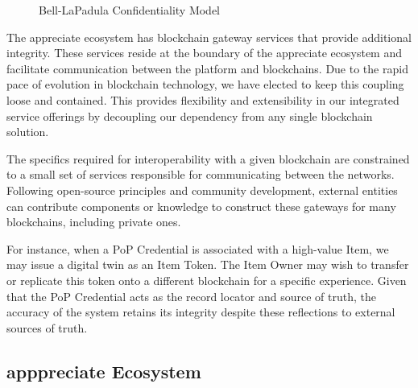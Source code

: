 \documentclass[a4paper,onecolumn, 10.5pt]{article}
\begin{document}
\begin{figure}[!htb]
	\centering %
	\caption{Bell-LaPadula Confidentiality Model}
	\label{fig: bella}
\end{figure}


The appreciate ecosystem has blockchain gateway services that provide additional integrity. These services reside at the boundary of the appreciate ecosystem and facilitate communication between the platform and blockchains. Due to the rapid pace of evolution in blockchain technology, we have elected to keep this coupling loose and contained. This provides flexibility and extensibility in our integrated service offerings by decoupling our dependency from any single blockchain solution.

The specifics required for interoperability with a given blockchain are constrained to a small set of services responsible for communicating between the networks. Following open-source principles and community development, external entities can contribute components or knowledge to construct these gateways for many blockchains, including private ones. 



For instance, when a PoP Credential is associated with a high-value Item, we may issue a digital twin as an Item Token\cite{nfts}. The Item Owner may wish to transfer or replicate this token onto a different blockchain for a specific experience. Given that the PoP Credential acts as the record locator and source of truth, the accuracy of the system retains its integrity despite these reflections to external sources of truth.



\subsection{apppreciate Ecosystem}
\end{document}
